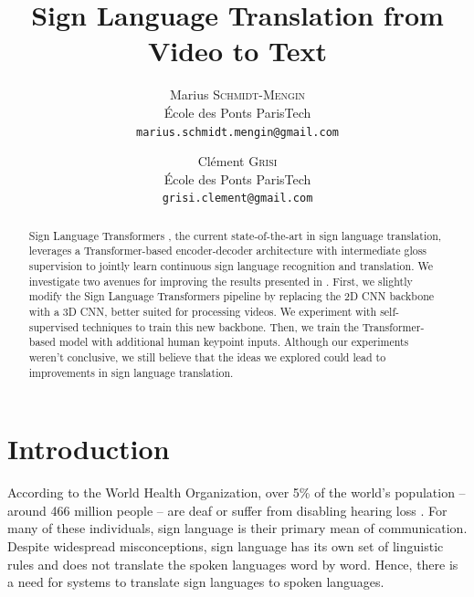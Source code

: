 \documentclass[final]{cvpr}
\begin{document}
\title{Sign Language Translation from Video to Text}

\author{Marius \textsc{Schmidt-Mengin}\\
	École des Ponts ParisTech\\
	{\tt\small marius.schmidt.mengin@gmail.com}
\and
Clément \textsc{Grisi}\\
École des Ponts ParisTech\\
{\tt\small grisi.clement@gmail.com}
}

\maketitle


\begin{abstract}
	Sign Language Transformers \cite{neccam}, the current state-of-the-art in sign language translation, leverages a Transformer-based encoder-decoder architecture with intermediate gloss supervision to jointly learn continuous sign language recognition and translation. We investigate two avenues for improving the results presented in \cite{neccam}. First, we slightly modify the Sign Language Transformers pipeline by replacing the 2D CNN backbone with a 3D CNN, better suited for processing videos. We experiment with self-supervised techniques to train this new backbone. Then, we train the Transformer-based model with additional human keypoint inputs. Although our experiments weren't conclusive, we still believe that the ideas we explored could lead to improvements in sign language translation.
	
\end{abstract}

\section{Introduction}
According to the World Health Organization, over 5\% of the world’s population -- around 466 million people – are deaf or suffer from disabling hearing loss \cite{WHO}. For many of these individuals, sign language is their primary mean of communication. Despite widespread misconceptions, sign language has its own set of linguistic rules and does not translate the spoken languages word by word. Hence, there is a need for systems to translate sign languages to spoken languages.
\end{document}
